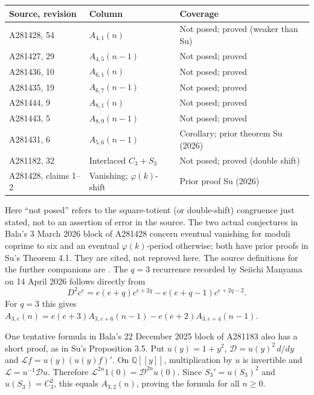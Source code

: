 \documentclass[11pt]{article}
\newcommand{\QQ}{\mathbb Q}
\begin{document}
\begin{center}\small
\begin{tabular}{lll}
\toprule
Source, revision & Column & Coverage\\
\midrule
A281428, 54 & $A_{4,1}(n)$ & Not posed; proved (weaker than Su)\\
A281427, 29 & $A_{4,5}(n-1)$ & Not posed; proved\\
A281436, 10 & $A_{6,1}(n)$ & Not posed; proved\\
A281435, 19 & $A_{6,7}(n-1)$ & Not posed; proved\\
A281444, 9 & $A_{8,1}(n)$ & Not posed; proved\\
A281443, 5 & $A_{8,9}(n-1)$ & Not posed; proved\\
A281431, 6 & $A_{5,6}(n-1)$ & Corollary; prior theorem Su (2026)\\
A281182, 32 & Interlaced $C_3+S_3$ & Not posed; proved (double shift)\\
A281428, claims 1--2 & Vanishing; $\varphi(k)$-shift & Prior proof Su (2026)\\
\bottomrule
\end{tabular}
\end{center}
Here ``not posed'' refers to the square-totient (or double-shift)
congruence just stated, not to an assertion of error in the source.
The two actual conjectures in Bala's 3 March 2026 block of A281428
concern eventual vanishing for moduli coprime to six and an eventual
$\varphi(k)$-period otherwise; both have prior proofs in Su's
Theorem 4.1. They are cited, not reproved here. The source definitions
for the further companions are \cite{oeis182,oeis427,oeis428,oeis431,
oeis435,oeis436,oeis443,oeis444}.
The $q=3$ recurrence recorded by Seiichi Manyama on 14 April 2026
\cite{oeis181,oeis183,oeis184} follows directly from
\[
 D^2c^e=e(e+q)c^{e+2q}-e(e+q-1)c^{e+2q-2}.
\]
For $q=3$ this gives
$A_{3,e}(n)=e(e+3)A_{3,e+6}(n-1)-e(e+2)A_{3,e+4}(n-1)$.

One tentative formula in Bala's 22 December 2025 block of A281183 also
has a short proof, as in Su's Proposition 3.5. Put $u(y)=1+y^2$,
$\mathcal D=u(y)^2\,d/dy$ and $\mathcal Lf=u(y)(u(y)f)'$.
On $\QQ[[y]]$, multiplication by $u$ is invertible and
$\mathcal L=u^{-1}\mathcal D u$. Therefore
$\mathcal L^{2n}1(0)=\mathcal D^{2n}u(0)$.
Since $S_3'=u(S_3)^2$ and $u(S_3)=C_3^2$, this equals
$A_{3,2}(n)$, proving the formula for all $n\geq0$.
\end{document}
